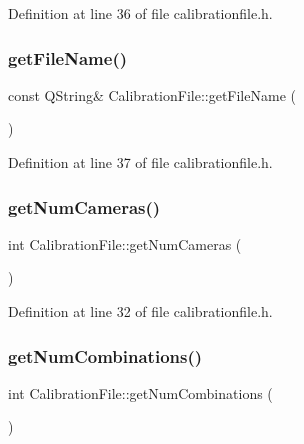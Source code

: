 Definition at line 36 of file calibrationfile.\+h.

\mbox{\label{class_calibration_file_a38a25f3a13cb12e0347a8dca5ab52e47}} 
\subsubsection{\texorpdfstring{getFileName()}{getFileName()}}
{\footnotesize\ttfamily const Q\+String\& Calibration\+File\+::get\+File\+Name (\begin{DoxyParamCaption}{ }\end{DoxyParamCaption})\hspace{0.3cm}{\ttfamily [inline]}}



Definition at line 37 of file calibrationfile.\+h.

\mbox{\label{class_calibration_file_ad5a0e31f58137b5742093686f41c945a}} 
\subsubsection{\texorpdfstring{getNumCameras()}{getNumCameras()}}
{\footnotesize\ttfamily int Calibration\+File\+::get\+Num\+Cameras (\begin{DoxyParamCaption}{ }\end{DoxyParamCaption})\hspace{0.3cm}{\ttfamily [inline]}}



Definition at line 32 of file calibrationfile.\+h.

\mbox{\label{class_calibration_file_ab710e524319fd492a8a136ba5b9666db}} 
\subsubsection{\texorpdfstring{getNumCombinations()}{getNumCombinations()}}
{\footnotesize\ttfamily int Calibration\+File\+::get\+Num\+Combinations (\begin{DoxyParamCaption}{ }\end{DoxyParamCaption})\hspace{0.3cm}{\ttfamily [inline]}}



